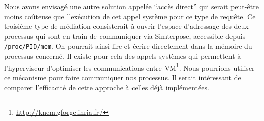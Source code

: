 Nous avons envisagé une autre solution appelée ``accès direct'' qui serait peut-être moins coûteuse que l'exécution de cet appel système pour ce type de requête. Ce troisième type de médiation consisterait à ouvrir l'espace d'adressage des deux processus qui sont en train de communiquer via Simterpose, accessible depuis \texttt{/proc/PID/mem}. On pourrait ainsi lire et écrire directement dans la mémoire du processus concerné. Il existe pour cela des appels systèmes qui permettent à l'hyperviseur d'optimiser les communications entre VM\footnote{\url{http://knem.gforge.inria.fr/}}. Nous pourrions utiliser ce mécanisme pour faire communiquer nos processus. Il serait intéressant de comparer l'efficacité de cette approche à celles déjà implémentées.
